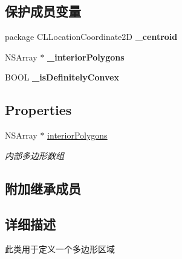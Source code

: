 \subsection*{保护成员变量}
\begin{DoxyCompactItemize}
\item 
\hypertarget{interface_b_m_k_polygon_ab6ba9bddb4458202dc547dd3a7d2f880}{package C\-L\-Location\-Coordinate2\-D {\bfseries \-\_\-centroid}}\label{interface_b_m_k_polygon_ab6ba9bddb4458202dc547dd3a7d2f880}

\item 
\hypertarget{interface_b_m_k_polygon_a2f794615e03edb6c089d892ee93c7f98}{N\-S\-Array $\ast$ {\bfseries \-\_\-interior\-Polygons}}\label{interface_b_m_k_polygon_a2f794615e03edb6c089d892ee93c7f98}

\item 
\hypertarget{interface_b_m_k_polygon_ac422f2bfe27b80c7b34a8f4d4c8bb4bb}{B\-O\-O\-L {\bfseries \-\_\-is\-Definitely\-Convex}}\label{interface_b_m_k_polygon_ac422f2bfe27b80c7b34a8f4d4c8bb4bb}

\end{DoxyCompactItemize}
\subsection*{Properties}
\begin{DoxyCompactItemize}
\item 
\hypertarget{interface_b_m_k_polygon_a7ff1fd88f27c07dbd6a2243178d7f8c4}{N\-S\-Array $\ast$ \hyperlink{interface_b_m_k_polygon_a7ff1fd88f27c07dbd6a2243178d7f8c4}{interior\-Polygons}}\label{interface_b_m_k_polygon_a7ff1fd88f27c07dbd6a2243178d7f8c4}

\begin{DoxyCompactList}\small\item\em 内部多边形数组 \end{DoxyCompactList}\end{DoxyCompactItemize}
\subsection*{附加继承成员}


\subsection{详细描述}
此类用于定义一个多边形区域 


